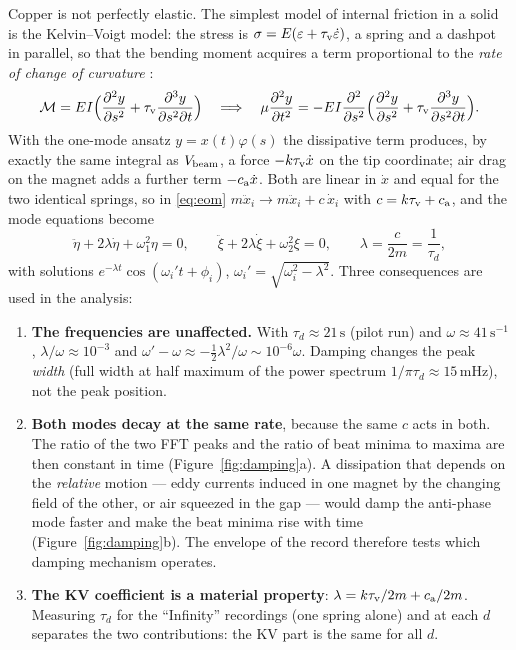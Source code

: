\documentclass[11pt,a4paper]{article}
\newcommand{\un}[1]{\,\mathrm{#1}}
\begin{document}
Copper is not perfectly elastic. The simplest model of internal friction in a solid is the Kelvin--Voigt model: the stress is $\sigma=E(\varepsilon+\tau_{\rm v}\dot\varepsilon)$, a spring and a dashpot in parallel, so that the bending moment acquires a term proportional to the \emph{rate of change of curvature} \cite{banks}:
\begin{equation}
\mathcal M=EI\Bigl(\frac{\partial^2y}{\partial s^2}+\tau_{\rm v}\frac{\partial^3 y}{\partial s^2\partial t}\Bigr)
\quad\Longrightarrow\quad
\mu\frac{\partial^2y}{\partial t^2}=-EI\frac{\partial^2}{\partial s^2}\Bigl(\frac{\partial^2y}{\partial s^2}+\tau_{\rm v}\frac{\partial^3y}{\partial s^2\partial t}\Bigr).
\label{eq:KV}
\end{equation}
With the one-mode ansatz $y=x(t)\varphi(s)$ the dissipative term produces, by exactly the same integral as $V_{\rm beam}$, a force $-k\tau_{\rm v}\dot x$ on the tip coordinate; air drag on the magnet adds a further term $-c_{\rm a}\dot x$. Both are linear in $\dot x$ and equal for the two identical springs, so in \eqref{eq:eom} $m\ddot x_i\to m\ddot x_i+c\,\dot x_i$ with $c=k\tau_{\rm v}+c_{\rm a}$, and the mode equations become
\begin{equation}
\ddot\eta+2\lambda\dot\eta+\omega_1^2\eta=0,\qquad \ddot\xi+2\lambda\dot\xi+\omega_2^2\xi=0,\qquad \lambda=\frac{c}{2m}=\frac1{\tau_d},
\end{equation}
with solutions $e^{-\lambda t}\cos(\omega_i't+\phi_i)$, $\omega_i'=\sqrt{\omega_i^2-\lambda^2}$. Three consequences are used in the analysis:
\begin{enumerate}[leftmargin=1.8em,itemsep=1pt]
\item \textbf{The frequencies are unaffected.} With $\tau_d\approx21\un{s}$ (pilot run) and $\omega\approx41\un{s^{-1}}$, $\lambda/\omega\approx10^{-3}$ and $\omega'-\omega\approx-\tfrac12\lambda^2/\omega\sim10^{-6}\omega$. Damping changes the peak \emph{width} (full width at half maximum of the power spectrum $1/\pi\tau_d\approx15\un{mHz}$), not the peak position.
\item \textbf{Both modes decay at the same rate}, because the same $c$ acts in both. The ratio of the two FFT peaks and the ratio of beat minima to maxima are then constant in time (Figure~\ref{fig:damping}a). A dissipation that depends on the \emph{relative} motion --- eddy currents induced in one magnet by the changing field of the other, or air squeezed in the gap --- would damp the anti-phase mode faster and make the beat minima rise with time (Figure~\ref{fig:damping}b). The envelope of the record therefore tests which damping mechanism operates.
\item \textbf{The KV coefficient is a material property}: $\lambda=k\tau_{\rm v}/2m+c_{\rm a}/2m$. Measuring $\tau_d$ for the ``Infinity'' recordings (one spring alone) and at each $d$ separates the two contributions: the KV part is the same for all $d$.
\end{enumerate}
\end{document}
